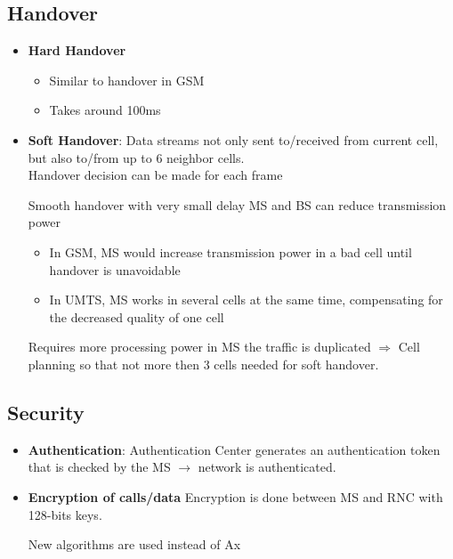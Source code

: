 \subsection{Handover}
\begin{itemize}
    \item \textbf{Hard Handover}
        \begin{itemize}
            \item Similar to handover in GSM
            \item Takes around 100ms
        \end{itemize}

    \item \textbf{Soft Handover}: Data streams not only sent to/received
        from current cell, but also to/from up to 6 neighbor cells.\\
        Handover decision can be made for each frame

        \begin{itemize}
                \proitem{} Smooth handover with very small delay
                \proitem{} MS and BS can reduce transmission power
                \begin{itemize}
                    \item In GSM, MS would increase transmission power in a bad cell
                        until handover is unavoidable
                    \item In UMTS, MS works in several cells at the same time, 
                        compensating for the decreased quality of one cell
                \end{itemize}
                \consitem{} Requires more processing power in MS
                \consitem{} the traffic is duplicated $\Rightarrow$ Cell
                planning so that not more then 3 cells needed for soft
                handover.
        \end{itemize}
\end{itemize}

\subsection{Security}
\begin{itemize}
    \item \textbf{Authentication}:
        Authentication Center generates an authentication token that is checked by the 
        MS $\to$ network is authenticated.
    \item \textbf{Encryption of calls/data}
        Encryption is done between MS and RNC with 128-bits keys. 

        New algorithms are used instead of Ax
\end{itemize}

